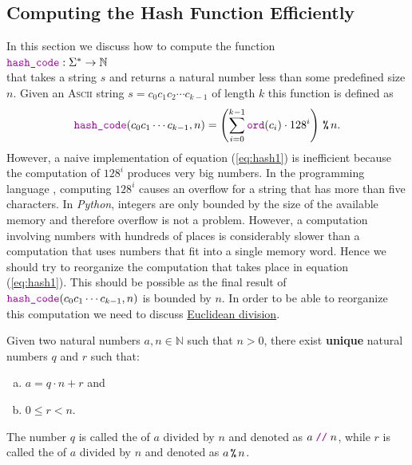 \subsection{Computing the Hash Function Efficiently}
In this section we discuss how to compute the function 
\\[0.2cm]
\hspace*{1.3cm}
$\mytt{hash\_code}:\Sigma^* \rightarrow \mathbb{N}$
\\[0.2cm]
that takes a string $s$ and returns a natural number less than some predefined size $n$.
Given an \textsc{Ascii} string $s = c_0 c_1 c_2 \cdots c_{k-1}$ of length $k$ this function is defined as
\begin{equation}
  \mytt{hash\_code}(c_0c_1\cdots c_{k-1}, n) = \left(\sum\limits_{i=0}^{k-1} \mytt{ord}(c_i) \cdot 128^i\right) \mmod n.
  \label{eq:hash1}
\end{equation}
However, a naive implementation of equation (\ref{eq:hash1}) is inefficient because the computation of $128^i$
produces very big numbers.  In the programming language , computing $128^i$ causes an overflow for a
string that has more than five characters.  In \textsl{Python}, integers are only bounded by the size of the
available memory and therefore overflow is not a problem.  However, a computation
involving numbers with hundreds of places is considerably slower than a computation that uses numbers that fit
into a single memory word. Hence we should try to reorganize the computation that takes place in equation
(\ref{eq:hash1}).  This should be possible as the final result of $\mytt{hash\_code}(c_0c_1\cdots c_{k-1}, n)$
is bounded by $n$.  In order to be able to reorganize this computation we need to discuss
\href{https://en.wikipedia.org/wiki/Euclidean_division}{Euclidean division}.

\begin{Theorem}
  Given two natural numbers $a, n \in \mathbb{N}$ such that $n > 0$, there exist \textbf{unique} natural numbers 
  $q$ and $r$ such that:
  \begin{enumerate}[(a)]
  \item $a = q \cdot n + r$ \quad and
  \item $0 \leq r < n$.
  \end{enumerate}
  The number $q$ is called the  of $a$ divided by $n$ and denoted as $a \;\mytt{//}\; n$, while
  $r$ is called the  of $a$ divided by $n$ and denoted as $a \,\texttt{\%}\, n$.  \eox
\end{Theorem}


